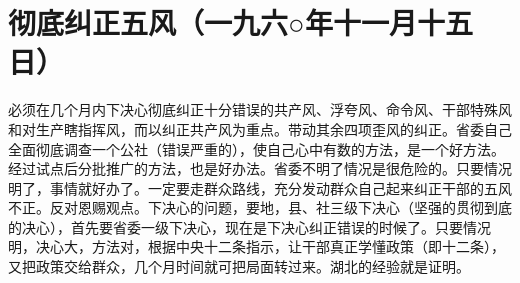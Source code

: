 \section[彻底纠正五风（一九六○年十一月十五日）]{彻底纠正五风（一九六○年十一月十五日）}


必须在几个月内下决心彻底纠正十分错误的共产风、浮夸风、命令风、干部特殊风和对生产瞎指挥风，而以纠正共产风为重点。带动其余四项歪风的纠正。省委自己全面彻底调查一个公社（错误严重的），使自己心中有数的方法，是一个好方法。经过试点后分批推广的方法，也是好办法。省委不明了情况是很危险的。只要情况明了，事情就好办了。一定要走群众路线，充分发动群众自己起来纠正干部的五风不正。反对恩赐观点。下决心的问题，要地，县、社三级下决心（坚强的贯彻到底的决心），首先要省委一级下决心，现在是下决心纠正错误的时候了。只要情况明，决心大，方法对，根据中央十二条指示，让干部真正学懂政策（即十二条），又把政策交给群众，几个月时间就可把局面转过来。湖北的经验就是证明。


